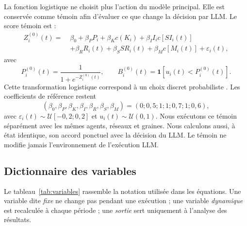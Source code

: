 \documentclass[10pt,a4paper]{article}
\begin{document}
La fonction logistique ne choisit plus l’action du modèle principal. Elle est
conservée comme témoin afin d’évaluer ce que change la décision par LLM. Le
score témoin est :
\[
\begin{aligned}
Z_i^{(0)}(t)=\;&\beta_0+\beta_PP_i+\beta_Kc(K_i)
+\beta_I I_i c[SI_i(t)]\\
&+\beta_RR_i(t)+\beta_SSR_i(t)
+\beta_Mc[M_i(t)]+\varepsilon_i(t),
\end{aligned}
\]
avec
\[
P_i^{(0)}(t)=\frac{1}{1+e^{-Z_i^{(0)}(t)}},\qquad
B_i^{(0)}(t)=\mathbf 1\!\left[u_i(t)<P_i^{(0)}(t)\right].
\]
Cette transformation logistique correspond à un choix discret probabiliste
\cite{mcfadden1974}. Les coefficients de référence restent
\[
(\beta_0,\beta_P,\beta_K,\beta_I,\beta_R,\beta_S,\beta_M)
=(0;0{,}5;1;1;0{,}7;1;0{,}6),
\]
avec $\varepsilon_i(t)\sim\mathcal U[-0{,}2;0{,}2]$ et
$u_i(t)\sim\mathcal U(0,1)$. Nous exécutons ce témoin séparément avec les mêmes
agents, réseaux et graines. Nous calculons aussi, à état identique, son accord
ponctuel avec la décision du LLM. Le témoin ne modifie jamais l’environnement
de l’exécution LLM.

\subsection{Dictionnaire des variables}

Le tableau~\ref{tab:variables} rassemble la notation utilisée dans les
équations. Une variable dite \emph{fixe} ne change pas pendant une exécution ;
une variable \emph{dynamique} est recalculée à chaque période ; une
\emph{sortie} sert uniquement à l’analyse des résultats.
\end{document}
